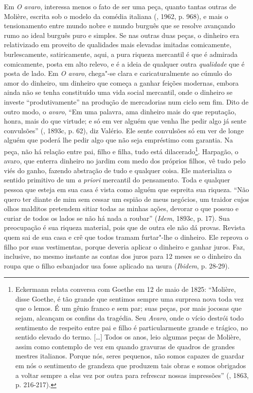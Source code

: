 Em \emph{O avaro}, interessa menos o fato de ser uma peça, quanto tantas
outras de Molière, escrita sob o modelo da comédia italiana (, 1962,
p. 968), e mais o tensionamento entre mundo nobre e mundo burguês que se
resolve avançando rumo ao ideal burguês puro e simples. Se nas outras
duas peças, o dinheiro era relativizado em proveito de qualidades mais
elevadas imitadas comicamente, burlescamente, satiricamente, aqui, a
pura riqueza mercantil é que é admirada comicamente, posta em alto
relevo, e é a ideia de qualquer outra \emph{qualidade} que é posta de
lado. Em \emph{O avaro}, chega"-se clara e caricaturalmente ao cúmulo do
amor do dinheiro, um dinheiro que começa a ganhar feições modernas,
embora ainda não se tenha constituído uma vida social mercantil, onde o
dinheiro se investe ``produtivamente'' na produção de mercadorias num
ciclo sem fim. Dito de outro modo, o \emph{avaro}, ``Em uma palavra, ama
dinheiro mais do que reputação, honra, mais do que virtude; e só em ver
alguém que venha lhe pedir algo já sente convulsões'' (, 1893c,
p. 62), diz Valério. Ele sente convulsões só em ver de longe alguém que
poderá lhe pedir algo que não seja empréstimo com garantia. Na peça, não
há relação entre pai, filho e filha, tudo está dilacerado\footnote{Eckermann
  relata conversa com Goethe em 12 de maio de 1825: ``Molière, disse
  Goethe, é tão grande que sentimos sempre uma surpresa nova toda vez
  que o lemos. É um gênio franco e sem par; suas peças, por mais jocosas
  que sejam, alcançam os confins da tragédia. Seu \emph{Avaro}, onde o
  vício destrói todo sentimento de respeito entre pai e filho é
  particularmente grande e trágico, no sentido elevado do termo.
  [\ldots{}] Todos os anos, leio algumas peças de Molière, assim como
  contemplo de vez em quando gravuras de quadros de grandes mestres
  italianos. Porque nós, seres pequenos, não somos capazes de guardar em
  nós o sentimento de grandeza que produzem tais obras e somos obrigados
  a voltar sempre a elas vez por outra para refrescar nossas
  impressões'' (, 1863, p. 216-217).}. Harpagão, o avaro, que
enterra dinheiro no jardim com medo dos próprios filhos, vê tudo pelo
viés do ganho, fazendo abstração de tudo e qualquer coisa. Ele
materializa o sentido primitivo de um \emph{a priori} mercantil do
pensamento. Toda e qualquer pessoa que esteja em sua casa é vista como
alguém que espreita sua riqueza. ``Não quero ter diante de mim sem
cessar um espião de meus negócios, um traidor cujos olhos malditos
pretendem sitiar todas as minhas ações, devorar o que possuo e curiar de
todos os lados se não há nada a roubar'' (\emph{Idem}, 1893c, p. 17).
Sua preocupação é sua riqueza material, pois que de outra ele não dá
provas. Revista quem sai de sua casa e crê que todos tramam furtar"-lhe o
dinheiro. Ele reprova o filho por suas vestimentas, porque deveria
aplicar o dinheiro e ganhar juros. Faz, inclusive, no mesmo instante as
contas dos juros para 12 meses se o dinheiro da roupa que o filho
esbanjador usa fosse aplicado na usura (\emph{Ibidem}, p. 28-29).

